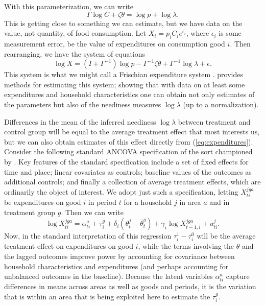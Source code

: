 \documentclass[11pt]{article}
\newcommand{\Eq}[1]{(\ref{eq:#1})}
\begin{document}
With this parameterization, we can write \[ \Gamma\log C + \zeta\theta
= \log p + \log\lambda.  \] This is getting close to something we can
estimate, but we have data on the value, not quantity, of food
consumption.  Let $X_i=p_iC_ie^{\epsilon_i}$, where $\epsilon_i$ is
some measurement error, be the value of expenditures on consumption
good $i$.  Then rearranging, we have the system of equations
\begin{equation}
\label{eq:expenditures}
\log X  = (I + \Gamma^{-1})\log p - \Gamma^{-1}\zeta\theta + \Gamma^{-1}\log\lambda
+ \epsilon.
\end{equation}
This system is what we might call a Frischian expenditure system
\citep{browning-etal85}.  \cite{ligon16a} provides methods for
estimating this system; showing that with data on at least some
expenditures and household characteristics one can obtain not only
estimates of the parameters but also of the neediness measures
$\log\lambda$ (up to a normalization).

Differences in the mean of the inferred neediness $\log\lambda$ between
treatment and control group will be equal to the average treatment
effect that most interests us, but we can also obtain estimates of
this effect directly from \Eq{expenditures}.  Consider the following
standard ANCOVA specification of the sort championed by
\cite{Mckenzie2012}.  Key features of the standard specification
include a set of fixed effects for time and place; linear covariates
as controls; baseline values of the outcomes as additional controls;
and finally a collection of average treatment effects, which are
ordinarily the object of interest.  We adopt just such a
specification, letting $X^{jga}_{ti}$ be expenditures on good $i$ in
period $t$ for a household \(j\) in area $a$ and in treatment group $g$.
Then we can write
\begin{equation}
\label{eq:ancova}
  \log X^{jga}_{ti} = \alpha^a_{ti} + \tau^g_i +  \delta_i(\theta^j_t - \bar\theta^g_t) + \gamma_i \log X^{jga}_{t-1,i} + u^j_{ti}.
\end{equation}
Now, in the standard interpretation of this regression $\tau^1_i-\tau^0_i$
will be the average treatment effect on expenditures on good $i$, while the terms
involving the $\theta$ and the lagged outcomes improve power by
accounting for covariance between household characteristics and
expenditures (and perhaps accounting for unbalanced outcomes in the
baseline).  Because the latent variables $\alpha^a_{ti}$ capture
differences in means across areas as well as goods and periods, it is
the variation that is within an area that is being exploited here to
estimate the $\tau^g_i$.
\end{document}
